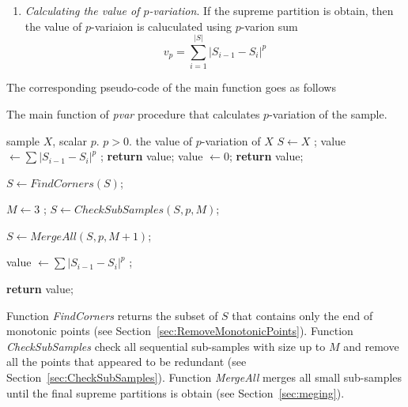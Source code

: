 \documentclass[12pt, a4paper]{article}
\numberwithin{equation}{section}
\begin{document}
\begin{enumerate}
  \item \emph{Calculating the value of $p$-variation}.  
  If the supreme partition is obtain, then
  the value of $p$-variaion is caluculated using 
  $p$-varion sum
  $$
  v_p = \sum_{i=1}^{|S|} |S_{i-1}-S_i |^p
  $$
  
  
\end{enumerate}



The corresponding pseudo-code of the main function goes as follows

\begin{algorithm}[H]
\caption{The main function of \emph{pvar} procedure that calculates $p$-variation of the sample.}\label{alg:pvarmain}
\begin{algorithmic}[1]
\Input sample $X$, scalar $p$.
\Require $p>0$.
\Output the value of $p$-variation of $X$
\State $S \leftarrow X$ ; 
  \State value $\leftarrow \sum |S_{i-1}-S_i |^p $ ; 
  \State \textbf{return} value; 
\EndIf
{}
  \State value $\leftarrow 0$;
  \State \textbf{return} value;
\EndIf

\State $S \leftarrow FindCorners(S)$;

\State $M \leftarrow 3$ ;
\State $S \leftarrow CheckSubSamples (S, p, M)$;

\State $S \leftarrow MergeAll (S,  p, M+1)$;

\State value $\leftarrow \sum |S_{i-1}-S_i |^p $ ; 

\State \textbf{return} value;
\EndFunction
\end{algorithmic}
\end{algorithm}


Function \emph{FindCorners} returns the
subset of $S$ that contains only the end of monotonic points (see Section~\ref{sec:RemoveMonotonicPoints}). 
Function \emph{CheckSubSamples} check all
sequential sub-samples with size up to $M$ and remove
all the points that appeared to be redundant (see Section~\ref{sec:CheckSubSamples}).
Function \emph{MergeAll} merges all small
sub-samples until the final supreme partitions is obtain (see Section~\ref{sec:meging}).
\end{document}

